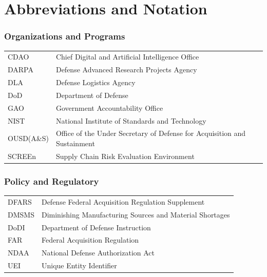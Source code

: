 
\chapter*{Abbreviations and Notation}

\vspace{-0.5em}

\subsection*{Organizations and Programs}

\begin{tabular}{@{}l l@{}}
CDAO    & Chief Digital and Artificial Intelligence Office \\
DARPA   & Defense Advanced Research Projects Agency \\
DLA     & Defense Logistics Agency \\
DoD     & Department of Defense \\
GAO     & Government Accountability Office \\
NIST    & National Institute of Standards and Technology \\
OUSD(A\&S) & Office of the Under Secretary of Defense for Acquisition and Sustainment \\
SCREEn  & Supply Chain Risk Evaluation Environment \\
\end{tabular}

\subsection*{Policy and Regulatory}

\begin{tabular}{@{}l l@{}}
DFARS   & Defense Federal Acquisition Regulation Supplement \\
DMSMS   & Diminishing Manufacturing Sources and Material Shortages \\
DoDI    & Department of Defense Instruction \\
FAR     & Federal Acquisition Regulation \\
NDAA    & National Defense Authorization Act \\
UEI     & Unique Entity Identifier \\
\end{tabular}


